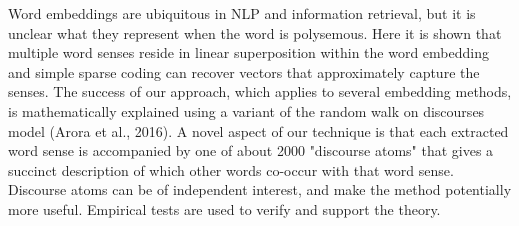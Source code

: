 Word embeddings are ubiquitous in NLP and information retrieval, but it is unclear what they represent when the word is polysemous. Here it is shown that multiple word senses reside in linear superposition within the word embedding and simple sparse coding can recover vectors that approximately capture the senses. The success of our approach, which applies to several embedding methods, is mathematically explained using a variant of the random walk on discourses model (Arora et al., 2016). A novel aspect of our technique is that each extracted word sense is accompanied by one of about 2000 "discourse atoms" that gives a succinct description of which other words co-occur with that word sense. Discourse atoms can be of independent interest, and make the method potentially more useful. Empirical tests are used to verify and support the theory.
